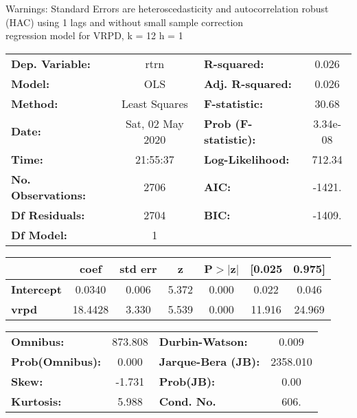 Warnings: \newline
 [1] Standard Errors are heteroscedasticity and autocorrelation robust (HAC) using 1 lags and without small sample correction\\ 

regression model for VRPD, k = 12 h = 1\begin{center}
\begin{tabular}{lclc}
\toprule
\textbf{Dep. Variable:}    &       rtrn       & \textbf{  R-squared:         } &     0.026   \\
\textbf{Model:}            &       OLS        & \textbf{  Adj. R-squared:    } &     0.026   \\
\textbf{Method:}           &  Least Squares   & \textbf{  F-statistic:       } &     30.68   \\
\textbf{Date:}             & Sat, 02 May 2020 & \textbf{  Prob (F-statistic):} &  3.34e-08   \\
\textbf{Time:}             &     21:55:37     & \textbf{  Log-Likelihood:    } &    712.34   \\
\textbf{No. Observations:} &        2706      & \textbf{  AIC:               } &    -1421.   \\
\textbf{Df Residuals:}     &        2704      & \textbf{  BIC:               } &    -1409.   \\
\textbf{Df Model:}         &           1      & \textbf{                     } &             \\
\bottomrule
\end{tabular}
\begin{tabular}{lcccccc}
                   & \textbf{coef} & \textbf{std err} & \textbf{z} & \textbf{P$> |$z$|$} & \textbf{[0.025} & \textbf{0.975]}  \\
\midrule
\textbf{Intercept} &       0.0340  &        0.006     &     5.372  &         0.000        &        0.022    &        0.046     \\
\textbf{vrpd}      &      18.4428  &        3.330     &     5.539  &         0.000        &       11.916    &       24.969     \\
\bottomrule
\end{tabular}
\begin{tabular}{lclc}
\textbf{Omnibus:}       & 873.808 & \textbf{  Durbin-Watson:     } &    0.009  \\
\textbf{Prob(Omnibus):} &   0.000 & \textbf{  Jarque-Bera (JB):  } & 2358.010  \\
\textbf{Skew:}          &  -1.731 & \textbf{  Prob(JB):          } &     0.00  \\
\textbf{Kurtosis:}      &   5.988 & \textbf{  Cond. No.          } &     606.  \\
\bottomrule
\end{tabular}
\end{center}

